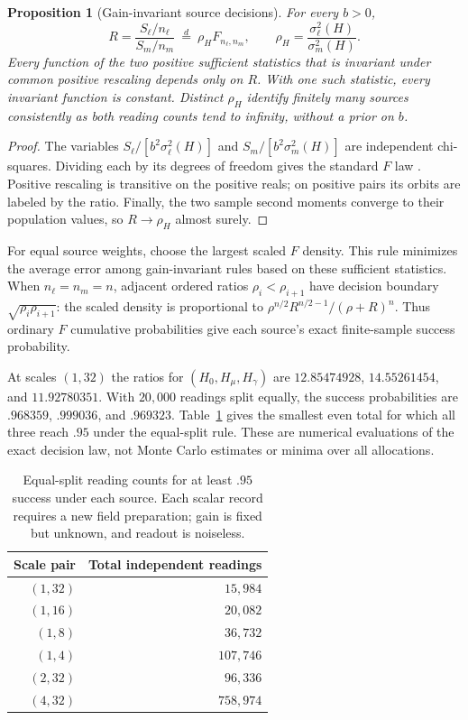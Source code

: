 \documentclass[12pt,a4paper]{article}
\newtheorem{proposition}[theorem]{Proposition}
\begin{document}
\begin{proposition}[Gain-invariant source decisions]\label{prop:ratio}
For every $b>0$,
\begin{equation}
 R=\frac{S_\ell/n_\ell}{S_m/n_m}
 \ \overset d=\ \rho_H F_{n_\ell,n_m},\qquad
 \rho_H=\frac{\sigma_\ell^2(H)}{\sigma_m^2(H)}.
 \label{eq:ratio}
\end{equation}
Every function of the two positive sufficient statistics that is
invariant under common positive rescaling depends only on $R$.
With one such statistic, every invariant function is constant.
Distinct $\rho_H$ identify finitely many sources consistently as
both reading counts tend to infinity, without a prior on $b$.
\end{proposition}
\begin{proof}
The variables $S_\ell/[b^2\sigma_\ell^2(H)]$ and
$S_m/[b^2\sigma_m^2(H)]$ are independent chi-squares. Dividing each
by its degrees of freedom gives the standard $F$ law
\cite{NISTF}. Positive rescaling is transitive on the positive reals;
on positive pairs its orbits are labeled by the ratio. Finally,
the two sample second moments converge to their population values,
so $R\to\rho_H$ almost surely.
\end{proof}

For equal source weights, choose the largest scaled $F$ density.
This rule minimizes the average error among gain-invariant rules
based on these sufficient statistics. When $n_\ell=n_m=n$, adjacent
ordered ratios $\rho_i<\rho_{i+1}$ have decision boundary
$\sqrt{\rho_i\rho_{i+1}}$: the scaled density is proportional to
$\rho^{n/2}R^{n/2-1}/(\rho+R)^n$.
Thus ordinary $F$ cumulative probabilities give each source's exact
finite-sample success probability.

At scales $(1,32)$ the ratios for $(H_0,H_\mu,H_\gamma)$ are
$12.85474928$, $14.55261454$, and $11.92780351$.
With $20{,}000$ readings split equally, the success probabilities are
$.968359$, $.999036$, and $.969323$. Table~\ref{tab:ratio-counts}
gives the smallest even total for which all three reach $.95$ under
the equal-split rule. These are numerical evaluations of the exact
decision law, not Monte Carlo estimates or minima over all allocations.

\begin{table}[ht]
\centering\small
\begin{tabular}{rr}
\toprule
Scale pair & Total independent readings\\
\midrule
$(1,32)$ & $15{,}984$\\
$(1,16)$ & $20{,}082$\\
$(1,8)$ & $36{,}732$\\
$(1,4)$ & $107{,}746$\\
$(2,32)$ & $96{,}336$\\
$(4,32)$ & $758{,}974$\\
\bottomrule
\end{tabular}
\caption{Equal-split reading counts for at least $.95$ success under
each source. Each scalar record requires a new field preparation;
gain is fixed but unknown, and readout is noiseless.}
\label{tab:ratio-counts}
\end{table}
\end{document}
